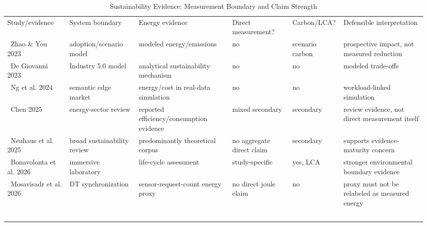 \begin{table}[!t]\centering\caption{Sustainability Evidence: Measurement Boundary and Claim Strength}\label{tab:susexpanded}\scriptsize\begin{tabularx}{\textwidth}{p{}p{}p{}p{}p{}Y}\toprule Study/evidence & System boundary & Energy evidence & Direct measurement? & Carbon/LCA? & Defensible interpretation \\\ \midrule Zhao \& You 2023 & adoption/scenario model & modeled energy/emissions & no & scenario carbon & prospective impact, not measured reduction \\\ De Giovanni 2023 & Industry 5.0 model & analytical sustainability mechanism & no & no & modeled trade-offs \\\ Ng et al. 2024 & semantic edge market & energy/cost in real-data simulation & no & no & workload-linked simulation \\\ Chen 2025 & energy-sector review & reported efficiency/consumption evidence & mixed secondary & secondary & review evidence, not direct measurement itself \\\ Neuhaus et al. 2025 & broad sustainability review & predominantly theoretical corpus & no aggregate direct claim & secondary & supports evidence-maturity concern \\\ Bonavolonta et al. 2026 & immersive laboratory & life-cycle assessment & study-specific & yes, LCA & stronger environmental boundary evidence \\\ Mosavisadr et al. 2026 & DT synchronization & sensor-request-count energy proxy & no direct joule claim & no & proxy must not be relabeled as measured energy \\\ \bottomrule\end{tabularx}\end{table}